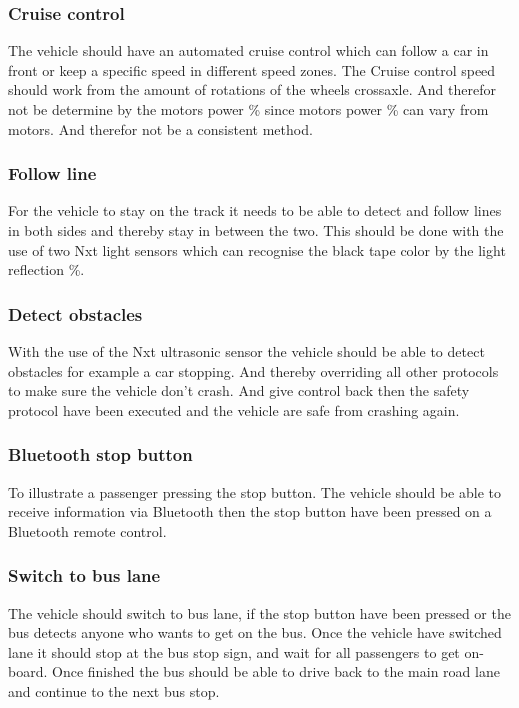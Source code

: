 \subsubsection{Cruise control}
The vehicle should have an automated cruise control which can follow a car in front or keep a specific speed in different speed zones. The Cruise control speed should work from the amount of rotations of the wheels crossaxle. And therefor not be determine by the motors power \% since motors power \% can vary from motors. And therefor not be a consistent method.

\subsubsection{Follow line}
For the vehicle to stay on the track it needs to be able to detect and follow lines in both sides and thereby stay in between the two. This should be done with the use of two Nxt light sensors which can recognise the black tape color by the light reflection \%. 

\subsubsection{Detect obstacles}
With the use of the Nxt ultrasonic sensor the vehicle should be able to detect obstacles for example a car stopping. And thereby overriding all other protocols to make sure the vehicle don't crash. And give control back then the safety protocol have been executed and the vehicle are safe from crashing again.   

\subsubsection{Bluetooth stop button}
To illustrate a passenger pressing the stop button. The vehicle should be able to receive information via Bluetooth then the stop button have been pressed on a Bluetooth remote control.

\subsubsection{Switch to bus lane}
The vehicle should switch to bus lane, if the stop button have been pressed or the bus detects anyone who wants to get on the bus. Once the vehicle have switched lane it should stop at the bus stop sign, and wait for all passengers to get on-board. Once finished the bus should be able to drive back to the main road lane and continue to the next bus stop.

